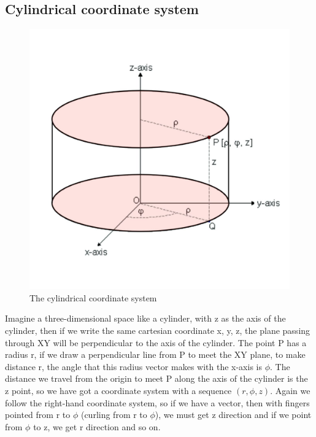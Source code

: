 \subsection{Cylindrical coordinate system}    
\begin{figure}[h]
\centering
\includegraphics[width=1\linewidth]{graphics/coordinatw}
\caption{The cylindrical coordinate system}
\end{figure} 

Imagine a three-dimensional space like a cylinder, with z as the axis of the cylinder, then if we write the same cartesian coordinate x, y, z, the plane passing through XY will be perpendicular to the axis of the cylinder. The point P has a radius r, if we draw a perpendicular line from P to meet the XY plane, to make distance r, the angle that this radius vector makes with the x-axis is $\phi$. The distance we travel from the origin to meet P along the axis of the cylinder is the z point, so we have got a coordinate system with a sequence $( r, \phi, z)$. Again we follow the right-hand coordinate system, so if we have a vector, then with fingers pointed from r to $\phi $ (curling from r to $\phi$), we must get z direction and if we point from $\phi$ to z, we get r direction and so on.

